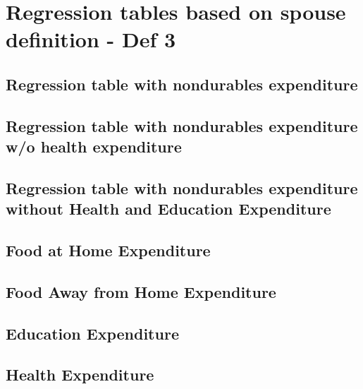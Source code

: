 \documentclass[a4paper,landscape]{article}
\begin{document}
\section{Regression tables based on spouse definition - Def 3}

\subsection{Regression table with nondurables expenditure}

\clearpage

\subsection{Regression table with nondurables expenditure w/o health expenditure} 

\clearpage

\subsection{Regression table with nondurables expenditure without Health and Education Expenditure}

\clearpage

\subsection{Food at Home Expenditure}

\clearpage

\subsection{Food Away from Home Expenditure}

\clearpage

\subsection{Education Expenditure}

\clearpage

\subsection{Health Expenditure}

\clearpage
\end{document}
